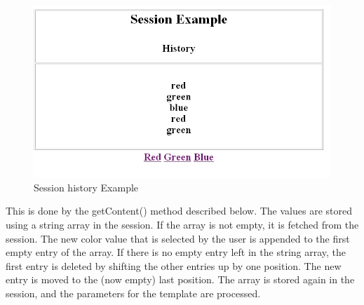 \begin{figure}
\begin{center}
\includegraphics[clip,width=\sgw]{pics/modules/37}
\end{center}
\caption[Session history Example]{Session history Example}
\label{SessionExample4}
\end{figure}

This is done by the {\meth getContent()} method described below. The values are
stored using a string array in the session. If the array is not empty,
it is fetched from the session. The new color value that is selected by
the user is appended to the first empty entry of the array. If there is
no empty entry left in the string array, the first entry is deleted by
shifting the other entries up by one position. The new entry is moved to
the (now empty) last position. The array is stored again in the session,
and the parameters for the template are processed.

